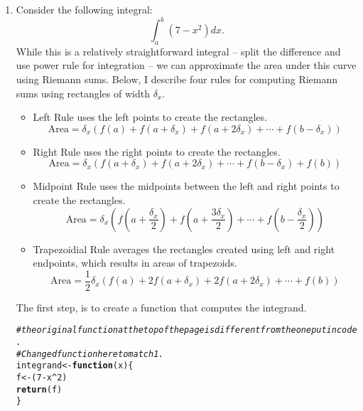 \documentclass{article}\usepackage[]{graphicx}\usepackage[]{xcolor}
\makeatletter
\newcommand{\hlnum}[1]{\textcolor[rgb]{0.686,0.059,0.569}{#1}}%
\newcommand{\hlcom}[1]{\textcolor[rgb]{0.678,0.584,0.686}{\textit{#1}}}%
\newcommand{\hlopt}[1]{\textcolor[rgb]{0,0,0}{#1}}%
\newcommand{\hldef}[1]{\textcolor[rgb]{0.345,0.345,0.345}{#1}}%
\newcommand{\hlkwa}[1]{\textcolor[rgb]{0.161,0.373,0.58}{\textbf{#1}}}%
\newcommand{\hlkwb}[1]{\textcolor[rgb]{0.69,0.353,0.396}{#1}}%
\newcommand{\hlkwc}[1]{\textcolor[rgb]{0.333,0.667,0.333}{#1}}%
\newcommand{\hlkwd}[1]{\textcolor[rgb]{0.737,0.353,0.396}{\textbf{#1}}}%
\newenvironment{kframe}{%
 \def\at@end@of@kframe{}%
 \ifinner\ifhmode%
  \def\at@end@of@kframe{\end{minipage}}%
  \begin{minipage}{\columnwidth}%
 \fi\fi%
 \def\FrameCommand##1{\hskip\@totalleftmargin \hskip-\fboxsep
 \colorbox{shadecolor}{##1}\hskip-\fboxsep
     \hskip-\linewidth \hskip-\@totalleftmargin \hskip\columnwidth}%
 \MakeFramed {\advance\hsize-\width
   \@totalleftmargin\z@ \linewidth\hsize
   \@setminipage}}%
 {\par\unskip\endMakeFramed%
 \at@end@of@kframe}
\newenvironment{knitrout}{}{} %
\makeatother
\begin{document}
\begin{enumerate}
\item Consider the following integral:
\[\int_{a}^{b} (7-x^2)dx.\]
While this is a relatively straightforward integral -- split the difference and use power rule for integration -- we can approximate the area under this curve using Riemann sums. Below, I describe four rules for computing Riemann sums using rectangles of width $\delta_x$.
\begin{itemize}
  \item Left Rule uses the left points to create the rectangles.
  \[\text{Area} = \delta_x (f(a) + f(a + \delta_x) + f(a +2\delta_x) + \cdots + f(b-\delta_x))\]
  \item Right Rule uses the right points to create the rectangles.
  \[\text{Area} = \delta_x (f(a + \delta_x) + f(a +2\delta_x) + \cdots + f(b-\delta_x) + f(b))\]
  \item Midpoint Rule uses the midpoints between the left and right points to create the rectangles.
  \[\text{Area} = \delta_x \left(f\left(a + \frac{\delta_x}{2}\right) + f\left(a + \frac{3\delta_x}{2}\right) + \cdots +  f\left(b - \frac{\delta_x}{2}\right)\right)\]
  \item Trapezoidial Rule averages the rectangles created using left and right endpoints, which results in areas of trapezoids.
  \[\text{Area} = \frac{1}{2} \delta_x \left(f(a) + 2f(a + \delta_x) + 2f(a+2\delta_x) + \cdots + f(b)\right)\]
\end{itemize}
The first step, is to create a function that computes the integrand.
\begin{knitrout}\scriptsize
{}\color{fgcolor}\begin{kframe}
\begin{alltt}
\hlcom{#the original function at the top of the page is different from the one put in code.}
\hlcom{#Changed function here to match 1.}
\hldef{integrand} \hlkwb{<-} \hlkwa{function}\hldef{(}\hlkwc{x}\hldef{)\{}
  \hldef{f} \hlkwb{<-} \hldef{(}\hlnum{7} \hlopt{-} \hldef{x}\hlopt{^}\hlnum{2}\hldef{)}
  \hlkwd{return}\hldef{(f)}
\hldef{\}}
\end{alltt}
\end{kframe}

\end{knitrout}
\end{enumerate}
\end{document}
